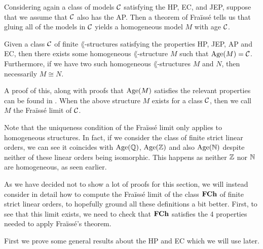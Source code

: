 Considering again a class of models $\mathcal{C}$ satisfying the HP, EC, and JEP, suppose that we assume that
$\mathcal{C}$ also has the AP. Then a theorem of Fraïssé tells us that gluing all of the models in $\mathcal{C}$
yields a homogeneous model $M$ with age $\mathcal{C}$.

\begin{thm}
  Given a class $\mathcal{C}$ of finite $\lang$-structures satisfying the properties HP, JEP, AP and EC, then
  there exists some homogeneous $\lang$-structure $M$ such that $\operatorname{Age}(M) = \mathcal{C}$. Furthermore, if we
  have two such homogeneous $\lang$-structures $M$ and $N$, then necessarily $M \cong N$.
\end{thm}

A proof of this, along with proofs that $\operatorname{Age}(M)$ satisfies the relevant properties can be found in
\cite{hodges93}. When the above structure $M$ exists for a class $\mathcal{C}$, then we call $M$ the Fraïssé
limit of $\mathcal{C}$.

Note that the uniqueness condition of the Fraïssé limit only applies to homogeneous
structures. In fact, if we consider the class of finite strict linear orders, we can see it
coincides with $\operatorname{Age}(\mathbb{Q})$, $\operatorname{Age}(\mathbb{Z})$ and also $\operatorname{Age}(\mathbb{N})$ despite neither of these linear orders
being isomorphic. This happens as neither $\mathbb{Z}$ nor $\mathbb{N}$ are homogeneous,
as seen earlier.

As we have decided not to show a lot of proofs for this section, we will instead consider in
detail how to compute the Fraïssé limit of the class $\textbf{FCh}$ of finite strict linear orders,
to hopefully ground all these definitions a bit better. First, to see that this limit exists, we
need to check that $\textbf{FCh}$ satisfies the 4 properties needed to apply Fraïssé's theorem.

First we prove some general results about the HP and EC which we will use later.

